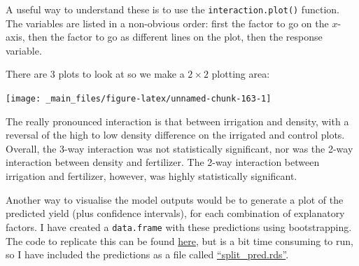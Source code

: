 \documentclass[]{book}
\newenvironment{Shaded}{\begin{snugshade}}{\end{snugshade}}
\newcommand{\KeywordTok}[1]{\textcolor[rgb]{0.13,0.29,0.53}{\textbf{#1}}}
\newcommand{\DataTypeTok}[1]{\textcolor[rgb]{0.13,0.29,0.53}{#1}}
\newcommand{\DecValTok}[1]{\textcolor[rgb]{0.00,0.00,0.81}{#1}}
\newcommand{\OperatorTok}[1]{\textcolor[rgb]{0.81,0.36,0.00}{\textbf{#1}}}
\newcommand{\NormalTok}[1]{#1}
\theoremstyle{definition}
\theoremstyle{definition}
\theoremstyle{definition}
\theoremstyle{remark}
\begin{document}
A useful way to understand these is to use the
\texttt{interaction.plot()} function. The variables are listed in a
non-obvious order: first the factor to go on the \(x\)-axis, then the
factor to go as different lines on the plot, then the response variable.

\newpage

There are 3 plots to look at so we make a \(2 \times 2\) plotting area:

\begin{Shaded}
\end{Shaded}

\begin{center}\texttt{[image: \_main\_files/figure-latex/unnamed-chunk-163-1]} \end{center}

The really pronounced interaction is that between irrigation and
density, with a reversal of the high to low density difference on the
irrigated and control plots. Overall, the 3-way interaction was not
statistically significant, nor was the 2-way interaction between density
and fertilizer. The 2-way interaction between irrigation and fertilizer,
however, was highly statistically significant.

Another way to visualise the model outputs would be to generate a plot
of the predicted yield (plus confidence intervals), for each combination
of explanatory factors. I have created a \texttt{data.frame} with these
predictions using bootstrapping. The code to replicate this can be found
\protect\hyperlink{parboot}{here}, but is a bit time consuming to run,
so I have included the predictions as a file called
\href{https://exeter-data-analytics.github.io/StatModelling/_data/split_pred.rds}{``split\_pred.rds''}.
\end{document}
